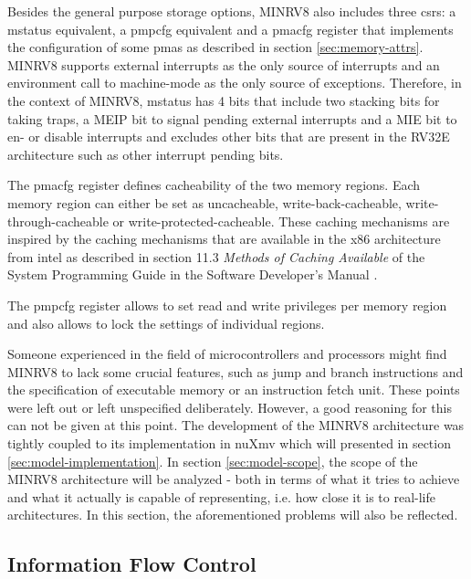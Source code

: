 Besides the general purpose storage options, MINRV8 also includes three \glspl{csr}: a \gls{mstatus} equivalent, a \gls{pmpcfg} equivalent and a \gls{pmacfg} register that implements the configuration of some \glspl{pma} as described in section \ref{sec:memory-attrs}.
MINRV8 supports external interrupts as the only source of interrupts and an environment call to machine-mode as the only source of exceptions.
Therefore, in the context of MINRV8, \gls{mstatus} has 4 bits that include two stacking bits for taking traps, a MEIP bit to signal pending external interrupts and a MIE bit to en- or disable interrupts and excludes other bits that are present in the RV32E architecture such as other interrupt pending bits.

The \gls{pmacfg} register defines cacheability of the two memory regions.
Each memory region can either be set as uncacheable, write-back-cacheable, write-through-cacheable or write-protected-cacheable.
These caching mechanisms are inspired by the caching mechanisms that are available in the x86 architecture from intel as described in section 11.3 \textit{Methods of Caching Available} of the System Programming Guide in the Software Developer's Manual \cite{IntelSystemProgramming}.

The \gls{pmpcfg} register allows to set read and write privileges per memory region and also allows to lock the settings of individual regions.

Someone experienced in the field of microcontrollers and processors might find MINRV8 to lack some crucial features, such as jump and branch instructions and the specification of executable memory or an instruction fetch unit.
These points were left out or left unspecified deliberately.
However, a good reasoning for this can not be given at this point.
The development of the MINRV8 architecture was tightly coupled to its implementation in nuXmv which will presented in section \ref{sec:model-implementation}.
In section \ref{sec:model-scope}, the scope of the MINRV8 architecture will be analyzed - both in terms of what it tries to achieve and what it actually is capable of representing, i.e. how close it is to real-life architectures.
In this section, the aforementioned problems will also be reflected.

\subsection{Information Flow Control}
\label{sec:ifc-model}

